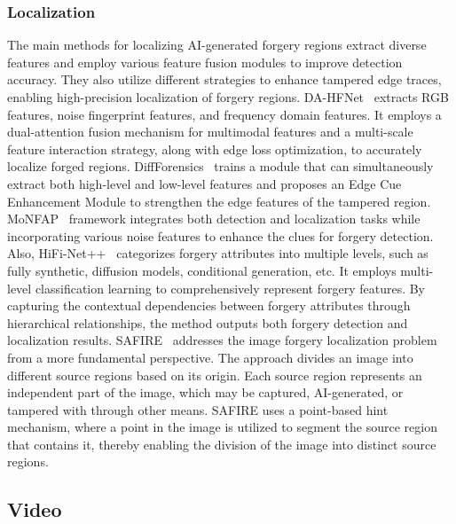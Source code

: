 \subsubsection{\textbf{Localization}}
The main methods for localizing AI-generated forgery regions extract diverse features and employ various feature fusion modules to improve detection accuracy. They also utilize different strategies to enhance tampered edge traces, enabling high-precision localization of forgery regions.
DA-HFNet~\cite{liu2024hfnet} extracts RGB features, noise fingerprint features, and frequency domain features. It employs a dual-attention fusion mechanism for multimodal features and a multi-scale feature interaction strategy, along with edge loss optimization, to accurately localize forged regions. DiffForensics~\cite{yu2024diffforensics} trains a module that can simultaneously extract both high-level and low-level features and proposes an Edge Cue Enhancement Module to strengthen the edge features of the tampered region. MoNFAP~\cite{miao2024mixture} framework integrates both detection and localization tasks while incorporating various noise features to enhance the clues for forgery detection.
Also, HiFi-Net++~\cite{guo2024language} categorizes forgery attributes into multiple levels, such as fully synthetic, diffusion models, conditional generation, etc. It employs multi-level classification learning to comprehensively represent forgery features. By capturing the contextual dependencies between forgery attributes through hierarchical relationships, the method outputs both forgery detection and localization results.
SAFIRE~\cite{kwon2024safire} addresses the image forgery localization problem from a more fundamental perspective. The approach divides an image into different source regions based on its origin. Each source region represents an independent part of the image, which may be captured, AI-generated, or tampered with through other means. SAFIRE uses a point-based hint mechanism, where a point in the image is utilized to segment the source region that contains it, thereby enabling the division of the image into distinct source regions.


\subsection{Video}
